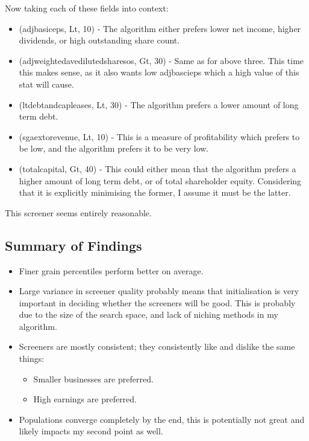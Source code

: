 Now taking each of these fields into context:
\begin{itemize}
    \item (adjbasiceps, Lt, 10) - The algorithm either prefers lower net income, higher dividends, or high outstanding share count.
    \item (adjweightedavedilutedsharesos, Gt, 30) - Same as for above three. This time this makes sense, as it also wants low adjbascieps which a high value of this stat will cause.
    \item (ltdebtandcapleases, Lt, 30) - The algorithm prefers a lower amount of long term debt.
    \item (sgaextorevenue, Lt, 10) - This is a measure of profitability which prefers to be low, and the algorithm prefers it to be very low.
    \item (totalcapital, Gt, 40) - This could either mean that the algorithm prefers a higher amount of long term debt, or of total shareholder equity. Considering that it is explicitly minimising the former, I assume it must be the latter.
\end{itemize}

This screener seems entirely reasonable.

\subsection{Summary of Findings}

\begin{itemize}
    \item Finer grain percentiles perform better on average.
    \item Large variance in screener quality probably means that initialisation is very important in deciding whether the screeners will be good. This is probably due to the size of the search space, and lack of niching methods in my algorithm.
    \item Screeners are mostly consistent; they consistently like and dislike the same things:
    \begin{itemize}
        \item Smaller businesses are preferred.
        \item High earnings are preferred.
    \end{itemize}
    \item Populations converge completely by the end, this is potentially not great and likely impacts my second point as well.
\end{itemize}


